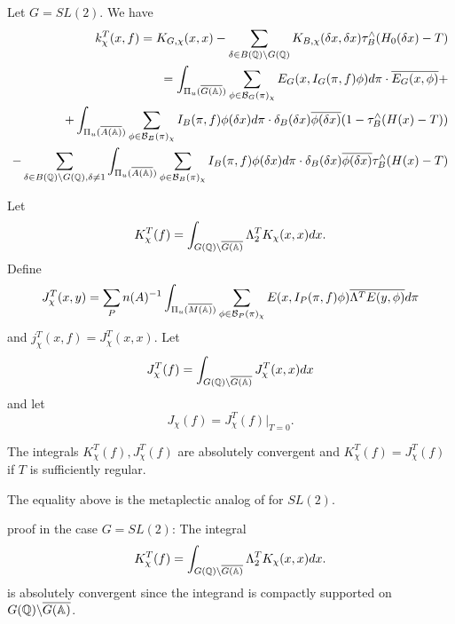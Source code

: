 \begin{example}\label{ex:5.22}
Let $G=SL(2)$. We have 
\begin{eqnarray*}
k_\chi ^T(x,f)
=K_{G,\chi }(x,x)-\sum_{\delta \in B(\mathbb{Q} )\backslash G(\mathbb{Q})}
K_{B,\chi }(\delta x,\delta x)
\tau _B^{\wedge }(H_0(\delta x)-T) \\
=\int_{\Pi _u(\overline{G(\mathbb{A} )})}
\sum_{\phi \in {\mathcal{B}}_G(\pi )_\chi}
E_G(x,I_G(\pi ,f)\phi )d\pi \cdot \overline{E_G(x,\phi )}+ \\
+\int_{\Pi _u(\overline{A(\mathbb{A} )})}
\sum_{\phi \in {\mathcal{B}}_B(\pi )_\chi }
I_B(\pi,f)\phi (\delta x)d\pi \cdot \delta _B(\delta x)
\overline{\phi (\delta x)}(1-\tau _B^{\wedge }(H(x)-T)) \\
-\sum_{ \delta \in B(\mathbb{Q} )\backslash G(\mathbb{Q} ), \delta \neq 1 }
\int_{\Pi _u(\overline{A(\mathbb{A} )})}
\sum_{\phi \in {\mathcal{B}}_B(\pi )_\chi }I_B(\pi,f)
\phi (\delta x)d\pi \cdot \delta _B(\delta x)
\overline{\phi (\delta x)}\tau _B^{\wedge }(H(x)-T)
\end{eqnarray*}
\end{example}

Let 
\begin{equation}\label{eq:5.21}
K_\chi ^T(f)=\int_{G(\mathbb{Q} )\backslash \overline{G(\mathbb{A} )}}
\Lambda _2^TK_\chi (x,x)dx.
\end{equation}
Define 
\begin{equation}\label{eq:5.22}
J_\chi ^T(x,y)=\sum_Pn(A)^{-1}
\int_{\Pi _u(\overline{M(\mathbb{A} )})}
\sum_{\phi \in {\mathcal{B}}_P(\pi )_\chi }
E(x,I_P(\pi ,f)\phi )\overline{\Lambda ^TE(y,\phi )}d\pi
\end{equation}
and $j_\chi ^T(x,f)=J_\chi ^T(x,x)$. Let 
\[
J_\chi ^T(f)
=\int_{G(\mathbb{Q} )\backslash \overline{G(\mathbb{A} )}}
J_\chi ^T(x,x)dx 
\]
and let
\begin{equation}\label{eq:5.23}
J_\chi (f)=J_\chi ^T(f)|_{T=0}.
\end{equation}

\begin{lemma}\label{lem:5.23}
The integrals $K_\chi ^T(f),J_\chi ^T(f)$ are absolutely convergent and $%
K_\chi ^T(f)=J_\chi ^T(f)$ if $T$ is sufficiently regular.
\end{lemma}

\begin{remark}\label{rem:5.24}
The equality above is the metaplectic analog of \cite[Lemma 2.4]{A3}
for $SL(2)$.
\end{remark}

proof in the case $G=SL(2)$: The integral 
\[
K_\chi ^T(f)
=\int_{G(\mathbb{Q} )\backslash \overline{G(\mathbb{A} )}}
\Lambda _2^TK_\chi (x,x)dx. 
\]
is absolutely convergent since the integrand is compactly
supported on $G(\mathbb{Q} )\backslash \overline{G(\mathbb{A} )}$.

